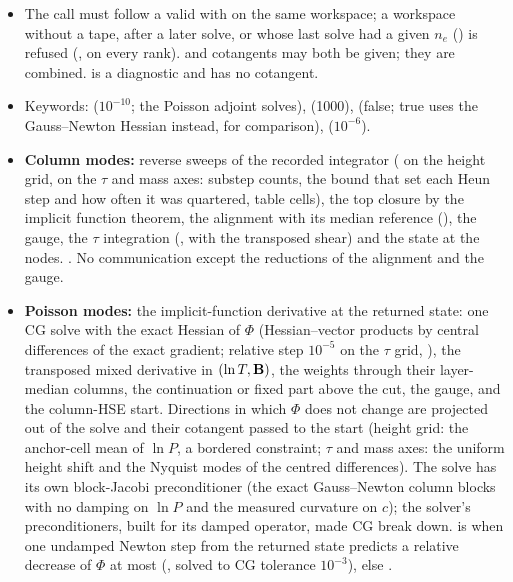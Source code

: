 \begin{itemize}
\item The call must follow a valid  with  on the same workspace; a workspace without
a tape, after a later solve, or whose last solve had a given $n_e$ () is refused (, on every rank).
 and  cotangents may both be given; they are combined.  is a diagnostic and has no cotangent.
\item Keywords:  ($10^{-10}$; the Poisson adjoint solves),  (1000),  (false; true
uses the Gauss--Newton Hessian instead, for comparison),  ($10^{-6}$).
\ifadjointcolumn
\item \textbf{Column modes:} reverse sweeps of the recorded integrator ( on the height grid,  on the
$\tau$ and mass axes: substep counts, the bound that set each Heun step and how often it was quartered, table cells), the top
closure by the implicit function theorem, the alignment with its median reference (), the gauge, the
$\tau$ integration (,  with the transposed shear) and the state at the nodes.
. No communication except the reductions of the alignment and the gauge.
\fi
\ifadjointpoisson
\item \textbf{Poisson modes:} the implicit-function derivative at the returned state: one CG solve with the exact Hessian of $\Phi$
(Hessian--vector products by central differences of the exact gradient; relative step $10^{-5}$ on the $\tau$ grid,
), the transposed mixed derivative in $(\ln T,\mathbf B)$, the weights through their layer-median columns, the
continuation or fixed part above the cut, the gauge, and the column-HSE start. Directions in which $\Phi$ does not change are
projected out of the solve and their cotangent passed to the start (height grid: the anchor-cell mean of $\ln P$, a bordered
constraint; $\tau$ and mass axes: the uniform height shift and the Nyquist modes of the centred differences). The solve has its
own block-Jacobi preconditioner (the exact Gauss--Newton column blocks with no damping on $\ln P$ and the measured curvature
on $c$); the solver's preconditioners, built for its damped operator, made CG break down.  is
 when one undamped Newton step from the returned state predicts a relative decrease of $\Phi$ at most
 (, solved to CG tolerance $10^{-3}$), else .

\end{itemize}
